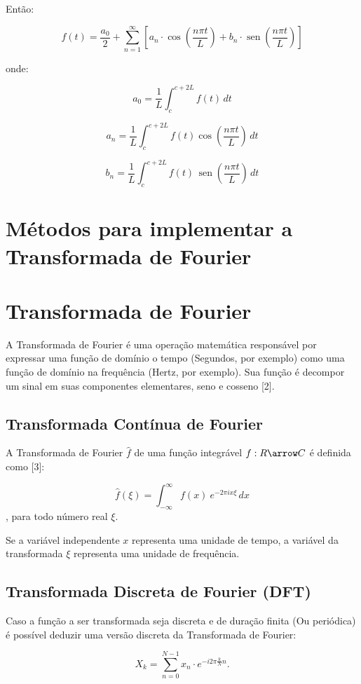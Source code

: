 \documentclass[brazil,times]{abnt}
\begin{document}
	Então:

	$$f(t) = \frac{a_0}{2} + \sum_{n=1}^{\infty}\left[a_n\cdot\cos\left(\frac{n \pi t}{L}\right) + b_n \cdot \operatorname{sen}\left(\frac{n \pi t}{L}\right)\right]$$

	onde:

	$$a_0=\frac{1}{L} \int_{c}^{c+2L} f(t)\,dt$$

	$$a_n=\frac{1}{L} \int_{c}^{c+2L} f(t) \cos\left(\frac{n \pi t}{L}\right)\,dt$$

	$$b_n=\frac{1}{L} \int_{c}^{c+2L} f(t) \,\operatorname{sen}\left(\frac{n \pi t}{L}\right)\,dt$$



\section*{Métodos para implementar a Transformada de Fourier}



\section*{Transformada de Fourier}
	A Transformada de Fourier é uma operação matemática responsável por expressar uma função de domínio o tempo (Segundos, por exemplo) como uma função de domínio na frequência (Hertz, por exemplo). Sua função é decompor um sinal em suas componentes elementares, seno e cosseno [2].

	\subsection*{Transformada Contínua de Fourier}
		A Transformada de Fourier $\hat{f}$ de uma função integrável $f: R \arrow C$ é definida como [3]:

		$$\hat{f}(\xi) = \int_{-\infty}^{\infty} f(x)\ e^{- 2\pi i x \xi}\,dx$$, para todo número real $\xi$.

		Se a variável independente $x$ representa uma unidade de tempo, a variável da transformada $\xi$ representa uma unidade de frequência. 

	\subsection*{Transformada Discreta de Fourier (DFT)}
		Caso a função a ser transformada seja discreta e de duração finita (Ou periódica) é possível deduzir uma versão discreta da Transformada de Fourier:

		$$X_k = \sum_{n=0}^{N-1} x_n \cdot e^{-i 2 \pi \frac{k}{N} n}.$$
\end{document}
